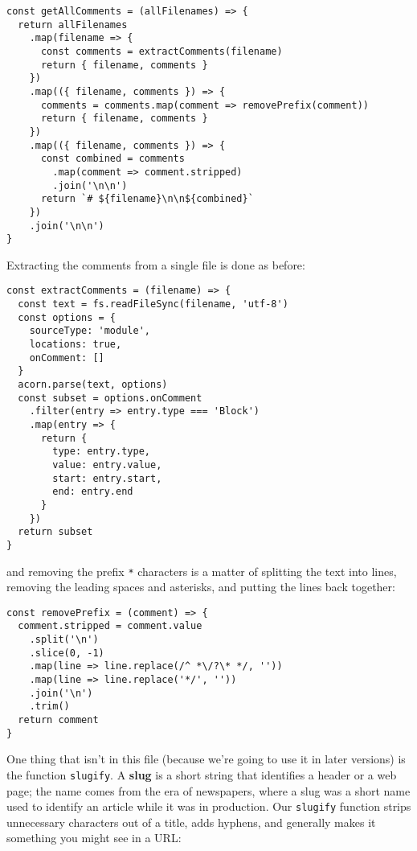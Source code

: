 \documentclass[krantzl]{krantz}
\newcommand{\glossref}[1]{\textbf{#1}}
\begin{document}
\begin{lstlisting}[frame=tblr]
const getAllComments = (allFilenames) => {
  return allFilenames
    .map(filename => {
      const comments = extractComments(filename)
      return { filename, comments }
    })
    .map(({ filename, comments }) => {
      comments = comments.map(comment => removePrefix(comment))
      return { filename, comments }
    })
    .map(({ filename, comments }) => {
      const combined = comments
        .map(comment => comment.stripped)
        .join('\n\n')
      return `# ${filename}\n\n${combined}`
    })
    .join('\n\n')
}
\end{lstlisting}



Extracting the comments from a single file is done as before:


\begin{lstlisting}[frame=tblr]
const extractComments = (filename) => {
  const text = fs.readFileSync(filename, 'utf-8')
  const options = {
    sourceType: 'module',
    locations: true,
    onComment: []
  }
  acorn.parse(text, options)
  const subset = options.onComment
    .filter(entry => entry.type === 'Block')
    .map(entry => {
      return {
        type: entry.type,
        value: entry.value,
        start: entry.start,
        end: entry.end
      }
    })
  return subset
}
\end{lstlisting}



\noindent and removing the prefix \texttt{*} characters is a matter of splitting the text into lines,
removing the leading spaces and asterisks,
and putting the lines back together:


\begin{lstlisting}[frame=tblr]
const removePrefix = (comment) => {
  comment.stripped = comment.value
    .split('\n')
    .slice(0, -1)
    .map(line => line.replace(/^ *\/?\* */, ''))
    .map(line => line.replace('*/', ''))
    .join('\n')
    .trim()
  return comment
}
\end{lstlisting}



One thing that isn’t in this file (because we’re going to use it in later versions)
is the function \texttt{slugify}.
A \glossref{slug} is a short string that identifies a header or a web page;
the name comes from the era of newspapers,
where a slug was a short name used to identify an article while it was in production.
Our \texttt{slugify} function strips unnecessary characters out of a title,
adds hyphens,
and generally makes it something you might see in a URL:
\end{document}
